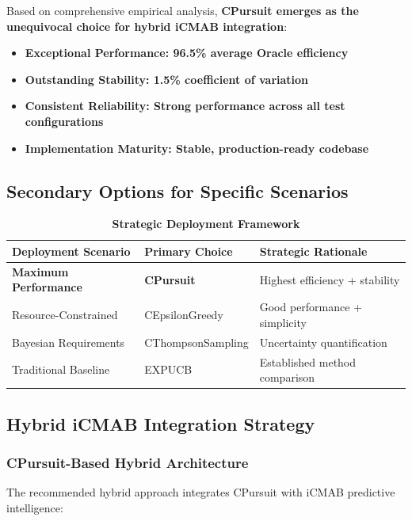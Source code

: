 \documentclass[12pt,a4paper]{article}
\newcommand{\performance}[1]{\textcolor{performancecolor}{\textbf{#1}}}
\newcommand{\success}[1]{\textcolor{successcolor}{\textbf{#1}}}
\newcommand{\hybrid}[1]{\textcolor{hybridcolor}{\textbf{#1}}}
\begin{document}
Based on comprehensive empirical analysis, \performance{CPursuit emerges as the unequivocal choice for hybrid iCMAB integration}:

\begin{itemize}
\item \success{\textbf{Exceptional Performance}: 96.5\% average Oracle efficiency}
\item \success{\textbf{Outstanding Stability}: 1.5\% coefficient of variation}
\item \success{\textbf{Consistent Reliability}: Strong performance across all test configurations}
\item \success{\textbf{Implementation Maturity}: Stable, production-ready codebase}
\end{itemize}

\subsection{Secondary Options for Specific Scenarios}

\begin{table}[H]
\centering
\caption{\hybrid{Strategic Deployment Framework}}
\begin{tabular}{|l|l|l|}
\hline
\textbf{Deployment Scenario} & \textbf{Primary Choice} & \textbf{Strategic Rationale} \\
\hline
\hline
\hybrid{Maximum Performance} & \hybrid{CPursuit} & Highest efficiency + stability \\
Resource-Constrained & CEpsilonGreedy & Good performance + simplicity \\
Bayesian Requirements & CThompsonSampling & Uncertainty quantification \\
Traditional Baseline & EXPUCB & Established method comparison \\
\hline
\end{tabular}
\end{table}

\subsection{Hybrid iCMAB Integration Strategy}

\subsubsection{CPursuit-Based Hybrid Architecture}

The recommended hybrid approach integrates CPursuit with iCMAB predictive intelligence:
\end{document}
